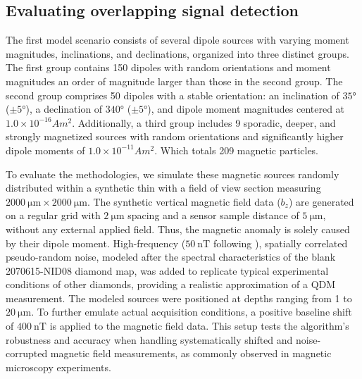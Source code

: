 \subsection{Evaluating overlapping signal detection}
\label{sec:synthetic-overlapping}

The first model scenario consists of several dipole sources with varying moment magnitudes, inclinations, and declinations, organized into three distinct groups. The first group contains 150 dipoles with random orientations and moment magnitudes an order of magnitude larger than those in the second group. The second group comprises 50 dipoles with a stable orientation: an inclination of \(\ang{35}\) (\(\pm \ang{5}\)), a declination of \(\ang{340}\) (\(\pm \ang{5}\)), and dipole moment magnitudes centered at \(1.0 \times 10^{-16} Am^2\). Additionally, a third group includes 9 sporadic, deeper, and strongly magnetized sources with random orientations and significantly higher dipole moments of \(1.0 \times 10^{-11} Am^2\). Which totals 209 magnetic particles.

To evaluate the methodologies, we simulate these magnetic sources randomly distributed within a synthetic thin with a field of view section measuring \(\qty{2000}{\micro\meter} \times \qty{2000}{\micro\meter}\). The synthetic vertical magnetic field data (\(b_z\)) are generated on a regular grid with \(\qty{2}{\micro\meter}\) spacing and a sensor sample distance of \(\qty{5}{\micro\meter}\), without any external applied field. Thus, the magnetic anomaly is solely caused by their dipole moment. High-frequency (\(\qty{50}{\nano\tesla}\) following \citet{Glenn2017}), spatially correlated pseudo-random noise, modeled after the spectral characteristics of the blank 2070615-NID08 diamond map, was added to replicate typical experimental conditions of other diamonds, providing a realistic approximation of a QDM measurement. The modeled sources were positioned at depths ranging from 1 to \(\qty{20}{\micro\meter}\). To further emulate actual acquisition conditions, a positive baseline shift of \(\qty{400}{\nano\tesla}\) \citep[following][]{Hess2024} is applied to the magnetic field data. This setup tests the algorithm's robustness and accuracy when handling systematically shifted and noise-corrupted magnetic field measurements, as commonly observed in magnetic microscopy experiments.

